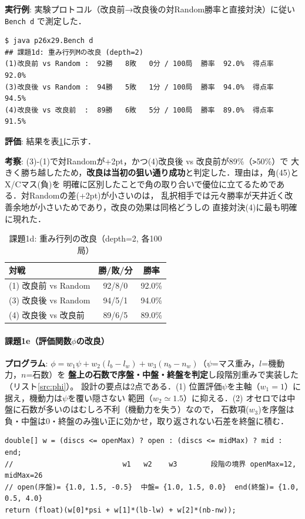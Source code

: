 \documentclass[11pt,a4j]{ujarticle} %
\begin{document}
\textbf{実行例}: 実験プロトコル（改良前→改良後の対Random勝率と直接対決）に従い {\verb+Bench d+} で測定した．
\begin{lstlisting}[caption=課題1dの実行例,label=ex:1d]
$ java p26x29.Bench d
## 課題1d: 重み行列Mの改良 (depth=2)
(1)改良前 vs Random :  92勝   8敗   0分 / 100局  勝率  92.0%  得点率  92.0%
(3)改良後 vs Random :  94勝   5敗   1分 / 100局  勝率  94.0%  得点率  94.5%
(4)改良後 vs 改良前  :  89勝   6敗   5分 / 100局  勝率  89.0%  得点率  91.5%
\end{lstlisting}

\textbf{評価}: 結果を表\ref{tab:1d}に示す．

\textbf{考察}: (3)-(1)で対Randomが+2pt，かつ(4)改良後 vs 改良前が89\%（{\verb+>+}50\%）で
大きく勝ち越したため，\textbf{改良は当初の狙い通り成功}と判定した．理由は，角(45)とX/Cマス(負)を
明確に区別したことで角の取り合いで優位に立てるためである．対Randomの差(+2pt)が小さいのは，
乱択相手では元々勝率が天井近く改善余地が小さいためであり，改良の効果は同格どうしの
直接対決(4)に最も明確に現れた．

\begin{table}[h]\center
\caption{課題1d: 重み行列の改良（depth=2, 各100局）}\label{tab:1d}
\begin{tabular}{l|c|c}
対戦 & 勝/敗/分 & 勝率 \\ \hline\hline
(1) 改良前 vs Random & 92/8/0 & 92.0\% \\
(3) 改良後 vs Random & 94/5/1 & 94.0\% \\
(4) 改良後 vs 改良前 & 89/6/5 & 89.0\% \\
\end{tabular}
\end{table}

\paragraph{課題1e（評価関数$\phi$の改良）}
\textbf{プログラム}: $\phi=w_1\psi+w_2(l_b-l_w)+w_3(n_b-n_w)$（$\psi$=マス重み，$l$=機動力，$n$=石数）を
\textbf{盤上の石数で序盤・中盤・終盤を判定}し段階別重みで実装した（リスト\ref{src:phi}）。
設計の要点は2点である．(1) 位置評価$\psi$を主軸（$w_1=1$）に据え，機動力は$\psi$を覆い隠さない
範囲（$w_2\simeq1.5$）に抑える．(2) オセロでは中盤に石数が多いのはむしろ不利（機動力を失う）なので，
石数項($w_3$)を序盤は負・中盤は0・終盤のみ強い正に効かせ，取り返されない石差を終盤に積む．
\begin{lstlisting}[caption=段階別の動的評価（PhiEval）,label=src:phi]
double[] w = (discs <= openMax) ? open : (discs <= midMax) ? mid : end;
//                          w1   w2    w3        段階の境界 openMax=12, midMax=26
// open(序盤)= {1.0, 1.5, -0.5}  中盤= {1.0, 1.5, 0.0}  end(終盤)= {1.0, 0.5, 4.0}
return (float)(w[0]*psi + w[1]*(lb-lw) + w[2]*(nb-nw));
\end{lstlisting}
\end{document}
